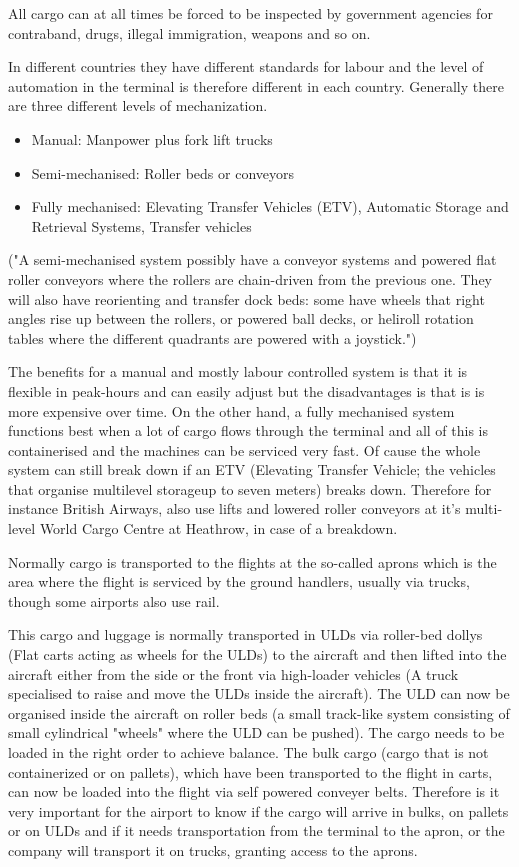 All cargo can at all times be forced to be inspected by government agencies for contraband, drugs, illegal immigration, weapons and so on.

In different countries they have different standards for labour and the level of automation in the terminal is therefore different in each country. Generally there are three different levels of mechanization.
\begin{itemize}
\item Manual: Manpower plus fork lift trucks
\item Semi-mechanised: Roller beds or conveyors
\item Fully mechanised: Elevating Transfer Vehicles (ETV), Automatic Storage and Retrieval Systems, Transfer vehicles
\end{itemize}

("A semi-mechanised system possibly have a conveyor systems and powered flat roller conveyors where the rollers are chain-driven from the previous one. They will also have reorienting and transfer dock beds: some have wheels that right angles rise up between the rollers, or powered ball decks, or heliroll rotation tables where the different quadrants are powered with a joystick.") %

The benefits for a manual and mostly labour controlled system is that it is flexible in peak-hours and can easily adjust but the  disadvantages is that is is more expensive over time.
On the other hand, a fully mechanised system functions best when a lot of cargo flows through the terminal and all of this is containerised and the machines can be serviced very fast. Of cause the whole system can still break down if an ETV (Elevating Transfer Vehicle; the vehicles that organise multilevel storageup to seven meters) breaks down.  Therefore for instance British Airways, also use lifts and lowered roller conveyors at it's multi-level World Cargo Centre at Heathrow, in case of a breakdown.

Normally cargo is transported to the flights at the so-called aprons which is the area where the flight is serviced by the ground handlers, usually via trucks, though some airports also use rail.

This cargo and luggage is normally transported in ULDs via roller-bed dollys (Flat carts acting as wheels for the ULDs) to the aircraft and then lifted into the aircraft either from the side or the front via high-loader vehicles (A truck specialised to raise and move the ULDs inside the aircraft).
The ULD can now be organised inside the aircraft on roller beds (a small track-like system consisting of small cylindrical "wheels" where the ULD can be pushed). The cargo needs to be loaded in the right order to achieve balance. The bulk cargo (cargo that is not containerized or on pallets), which have been transported to the flight in carts, can now be loaded into the flight via self powered conveyer belts. Therefore is it very important for the airport to know if the cargo will arrive in bulks, on pallets or on ULDs and if it needs transportation from the terminal to the apron, or the company will transport it on trucks, granting access to the aprons.

